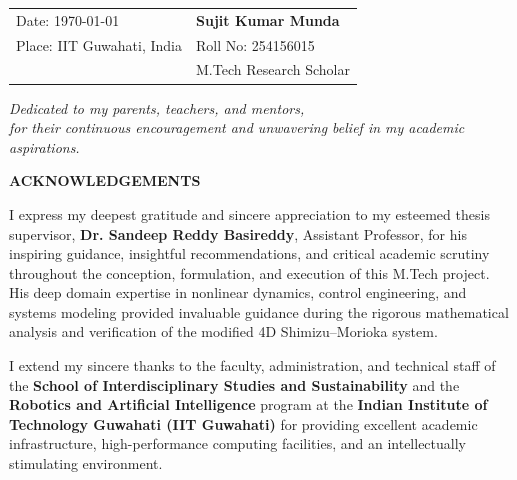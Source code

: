\documentclass[12pt,a4paper,oneside]{report}
\begin{document}
\vspace{2.5cm}
\noindent\begin{tabular}{@{}ll@{}}
Date: \today & \hspace{6.0cm} \textbf{Sujit Kumar Munda} \\
Place: IIT Guwahati, India & \hspace{6.0cm} Roll No: 254156015 \\
 & \hspace{6.0cm} M.Tech Research Scholar
\end{tabular}

\newpage
\thispagestyle{empty}
\vspace*{7cm}
\begin{center}
    \textit{Dedicated to my parents, teachers, and mentors,\\for their continuous encouragement and unwavering belief in my academic aspirations.}
\end{center}

\newpage
\thispagestyle{plain}
\begin{center}
    {\Large \bfseries ACKNOWLEDGEMENTS} \par
\end{center}
\vspace{0.6cm}

I express my deepest gratitude and sincere appreciation to my esteemed thesis supervisor, \textbf{Dr. Sandeep Reddy Basireddy}, Assistant Professor, for his inspiring guidance, insightful recommendations, and critical academic scrutiny throughout the conception, formulation, and execution of this M.Tech project. His deep domain expertise in nonlinear dynamics, control engineering, and systems modeling provided invaluable guidance during the rigorous mathematical analysis and verification of the modified 4D Shimizu--Morioka system.

I extend my sincere thanks to the faculty, administration, and technical staff of the \textbf{School of Interdisciplinary Studies and Sustainability} and the \textbf{Robotics and Artificial Intelligence} program at the \textbf{Indian Institute of Technology Guwahati (IIT Guwahati)} for providing excellent academic infrastructure, high-performance computing facilities, and an intellectually stimulating environment.
\end{document}
